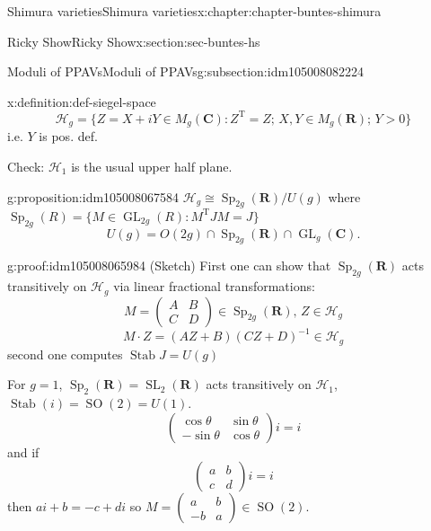\documentclass[oneside,10pt,]{book}
\numberwithin{equation}{section}
\newcommand{\inv}{^{-1}}
\newcommand{\RR}{\mathbf{R}}
\newcommand{\CC}{\mathbf{C}}
\newcommand{\transpose}{\mathrm{T}}
\DeclareMathOperator{\Stab}{Stab}
\DeclareMathOperator{\SL}{SL}
\DeclareMathOperator{\GL}{GL}
\DeclareMathOperator{\specialorthogonal}{SO}
\DeclareMathOperator{\Sp}{Sp}
\newcommand{\gt}{>}
\newcommand{\amp}{&}
\begin{document}
\begin{chapterptx}{Shimura varieties}{}{Shimura varieties}{}{}{x:chapter:chapter-buntes-shimura}
\begin{sectionptx}{Ricky Show}{}{Ricky Show}{}{}{x:section:sec-buntes-hs}
\begin{subsectionptx}{Moduli of PPAVs}{}{Moduli of PPAVs}{}{}{g:subsection:idm105008082224}
\begin{definition}{}{x:definition:def-siegel-space}
\begin{equation*}
\mathscr H_g = \{ Z = X+iY \in M_g(\CC) : Z^\transpose  = Z ; \, X,Y \in M_g(\RR); \, Y \gt 0\}
\end{equation*}
i.e. \(Y\) is pos. def.%
\end{definition}
Check: \(\mathscr H_1\) is the usual upper half plane.%
\begin{proposition}{}{}{g:proposition:idm105008067584}%
\(\mathscr H_g \cong \Sp_{2g}(\RR)/U(g)\) where \(\Sp_{2g} (R) = \{ M \in \GL_{2g}(R) : M^\transpose J M = J\}\)%
\begin{equation*}
U(g) = O(2g) \cap \Sp_{2g}(\RR) \cap \GL_{g}(\CC)\text{.}
\end{equation*}
%
\end{proposition}
\begin{proofptx}{}{g:proof:idm105008065984}
(Sketch) First one can show that \(\Sp_{2g}(\RR)\) acts transitively on \(\mathscr H_g\) via linear fractional transformations:%
\begin{equation*}
M = \begin{pmatrix} A\amp B\\ C\amp D\end{pmatrix} \in \Sp_{2g}(\RR),\, Z\in \mathscr H_g
\end{equation*}
%
\begin{equation*}
M\cdot Z = (AZ+B)(CZ+D)\inv \in \mathscr H_g
\end{equation*}
second one computes \(\Stab J = U(g)\)%
\par
For \(g= 1\), \(\Sp_2(\RR) = \SL_2(\RR)\) acts transitively on \(\mathscr H_1\), \(\Stab(i) = \specialorthogonal (2) = U(1)\).%
\begin{equation*}
\begin{pmatrix} \cos \theta\amp \sin \theta \\ - \sin \theta \amp \cos \theta \end{pmatrix} i = i
\end{equation*}
and if%
\begin{equation*}
\begin{pmatrix} a \amp b \\ c \amp d\end{pmatrix} i = i
\end{equation*}
then \(ai + b = -c + di\) so \(M= \begin{pmatrix} a\amp b\\ -b \amp a \end{pmatrix}\in \specialorthogonal(2)\).%
\end{proofptx}

\end{subsectionptx}
\end{sectionptx}
\end{chapterptx}
\end{document}
